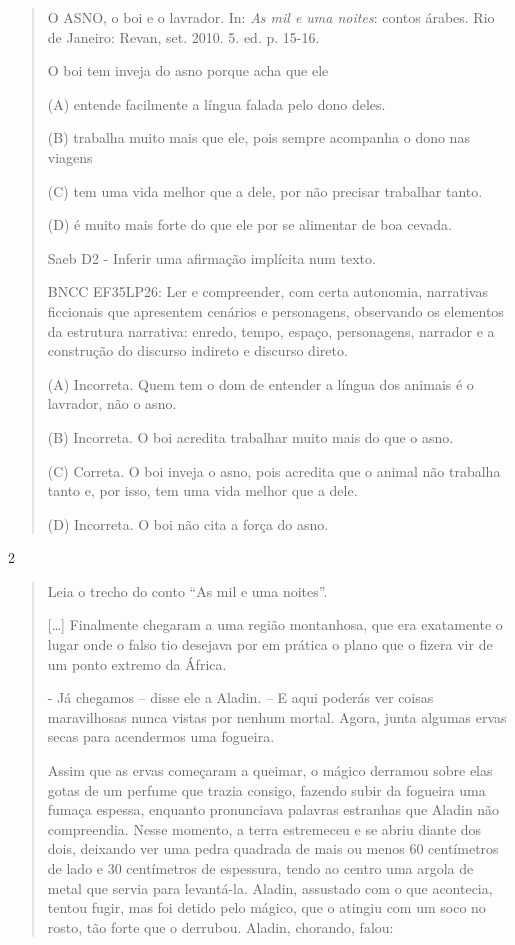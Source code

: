 \begin{escolha}
\begin{quote}
O ASNO, o boi e o lavrador. In: \emph{As mil e uma noites}: contos
árabes. Rio de Janeiro: Revan, set. 2010. 5. ed. p. 15-16.

O boi tem inveja do asno porque acha que ele

(A) entende facilmente a língua falada pelo dono deles.

(B) trabalha muito mais que ele, pois sempre acompanha o dono nas
viagens

(C) tem uma vida melhor que a dele, por não precisar trabalhar tanto.

(D) é muito mais forte do que ele por se alimentar de boa cevada.

Saeb D2 - Inferir uma afirmação implícita num texto.

BNCC EF35LP26: Ler e compreender, com certa autonomia, narrativas
ficcionais que apresentem cenários e personagens, observando os
elementos da estrutura narrativa: enredo, tempo, espaço, personagens,
narrador e a construção do discurso indireto e discurso direto.

(A) Incorreta. Quem tem o dom de entender a língua dos animais é o
lavrador, não o asno.

(B) Incorreta. O boi acredita trabalhar muito mais do que o asno.

(C) Correta. O boi inveja o asno, pois acredita que o animal não
trabalha tanto e, por isso, tem uma vida melhor que a dele.

(D) Incorreta. O boi não cita a força do asno.
\end{quote}

\num{2}

\begin{quote}
Leia o trecho do conto ``As mil e uma noites''.

{[}\ldots{}{]} Finalmente chegaram a uma região montanhosa, que era
exatamente o lugar onde o falso tio desejava por em prática o plano que
o fizera vir de um ponto extremo da África.

- Já chegamos -- disse ele a Aladin. -- E aqui poderás ver coisas
maravilhosas nunca vistas por nenhum mortal. Agora, junta algumas ervas
secas para acendermos uma fogueira.

Assim que as ervas começaram a queimar, o mágico derramou sobre elas
gotas de um perfume que trazia consigo, fazendo subir da fogueira uma
fumaça espessa, enquanto pronunciava palavras estranhas que Aladin não
compreendia. Nesse momento, a terra estremeceu e se abriu diante dos
dois, deixando ver uma pedra quadrada de mais ou menos 60 centímetros de
lado e 30 centímetros de espessura, tendo ao centro uma argola de metal
que servia para levantá-la. Aladin, assustado com o que acontecia,
tentou fugir, mas foi detido pelo mágico, que o atingiu com um soco no
rosto, tão forte que o derrubou. Aladin, chorando, falou:


\end{quote}
\end{escolha}

